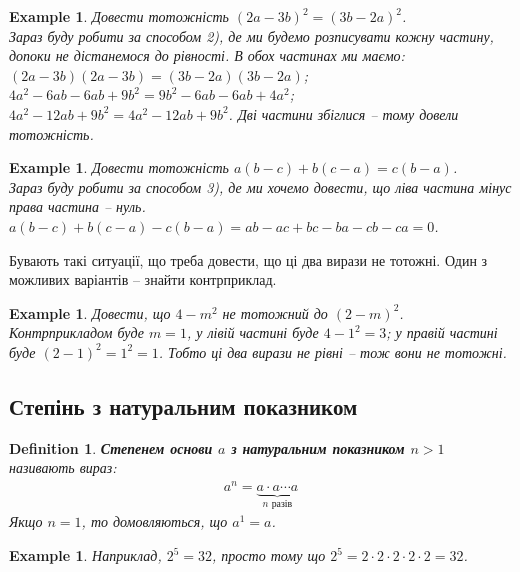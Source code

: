 \documentclass[a4paper, 10pt]{article}
\theoremstyle{theoremdd}
\theoremstyle{theoremdd}
\newtheorem{definition}[theorem]{Definition}
\theoremstyle{theoremdd}
\theoremstyle{theoremdd}
\newtheorem{example}[theorem]{Example}
\theoremstyle{theoremdd}
\theoremstyle{theoremdd}
\theoremstyle{theoremdd}
\theoremstyle{theoremdd}
\begin{document}
\begin{example}
Довести тотожність $(2a-3b)^2 = (3b-2a)^2$.\\
Зараз буду робити за способом 2), де ми будемо розписувати кожну частину, допоки не дістанемося до рівності. В обох частинах ми маємо:\\
$(2a-3b)(2a-3b) = (3b-2a)(3b-2a)$;\\
$4a^2 - 6ab - 6ab + 9b^2 = 9b^2 - 6ab - 6ab + 4a^2$;\\
$4a^2 - 12ab + 9b^2 = 4a^2 - 12ab + 9b^2$.
Дві частини збіглися -- тому довели тотожність.
\end{example}

\begin{example}
Довести тотожність $a(b-c) + b(c-a) = c(b-a)$.\\
Зараз буду робити за способом 3), де ми хочемо довести, що ліва частина мінус права частина -- нуль.\\
$a(b-c) + b(c-a) -c(b-a) = ab - ac + bc - ba - cb - ca = 0$.
\end{example}

Бувають такі ситуації, що треба довести, що ці два вирази не тотожні. Один з можливих варіантів -- знайти контрприклад.

\begin{example}
Довести, що $4 - m^2$ не тотожний до $(2-m)^2$.\\
Контрприкладом буде $m = 1$, у лівій частині буде $4 - 1^2 = 3$; у правій частині буде $(2-1)^2 = 1^2 = 1$. Тобто ці два вирази не рівні -- тож вони не тотожні.
\end{example}


\subsection{Степінь з натуральним показником}
\begin{definition}
\textbf{Степенем основи $a$ з натуральним показником $n > 1$} називають вираз:
\begin{align*}
a^n = \underbrace{a \cdot a \cdots a}_{\text{$n$ разів}}
\end{align*}
Якщо $n = 1$, то домовляються, що $a^1 = a$.
\end{definition}

\begin{example}
Наприклад, $2^5 = 32$, просто тому що $2^5 = 2 \cdot 2 \cdot 2 \cdot 2 \cdot 2 = 32$.
\end{example}
\end{document}

